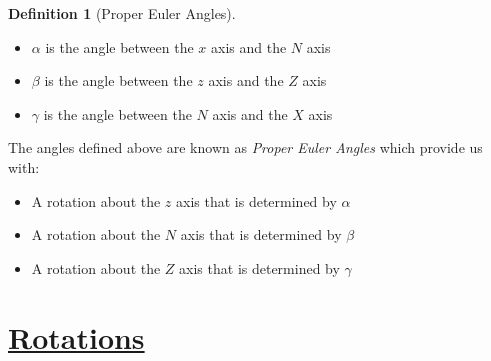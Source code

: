 \documentclass[12pt, letterpaper, onecolumn, conference, final]{IEEEtran}
\theoremstyle{definition}
\newtheorem{definition}{Definition}
\theoremstyle{plain}
\begin{document}
\begin{center}
{\begin{minipage}{7.3 in}
\begin{definition}[Proper Euler Angles]
\begin{itemize}
\item
$\alpha$ is the angle between the $x$ axis and the $N$ axis

\item
$\beta$ is the angle between the $z$ axis and the $Z$ axis

\item
$\gamma$ is the angle between the $N$ axis and the $X$ axis

\end{itemize}
The angles defined above are known as \textit{Proper Euler Angles} which provide us with:
\begin{itemize}

\item
A rotation about the $z$ axis that is determined by $\alpha$

\item
A rotation about the $N$ axis that is determined by $\beta$

\item
A rotation about the $Z$ axis that is determined by $\gamma$

\end{itemize}
\end{definition}
\end{minipage}}
\end{center}

\vspace{.3cm}
\section*{\underline{\textbf{Rotations}}}
\vspace{.3cm}
\begin{center}
\end{center}
\end{document}
